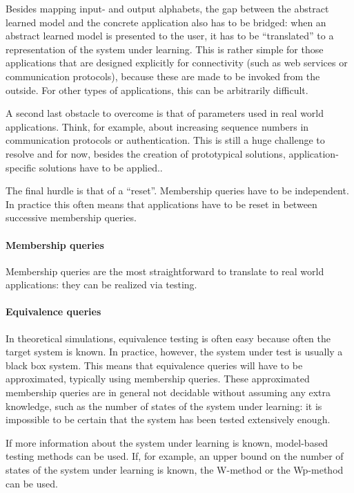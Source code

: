 \documentclass[multi,crop=false,class=article]{standalone}
\begin{document}
Besides mapping input- and output alphabets, the gap between the abstract learned model
and the concrete application also has to be bridged: when an abstract learned
model is presented to the user, it has to be ``translated'' to a representation
of the system under learning. This is rather simple for those applications that
are designed explicitly for connectivity (such as web services or communication
protocols), because these are made to be invoked from the outside. For other
types of applications, this can be arbitrarily difficult.

A second last obstacle to overcome is that of parameters used in real world
applications. Think, for example, about increasing sequence numbers in
communication protocols or authentication. This is still a huge challenge to
resolve and for now, besides the creation of prototypical solutions,
application-specific solutions have to be applied.\cite{Steffen11a}.

The final hurdle is that of a ``reset''. Membership queries have to be
independent. In practice this often means that applications have to be reset in
between successive membership queries.

\paragraph{Membership queries}
Membership queries are the most straightforward to translate to real world
applications: they can be realized via testing. %


\paragraph{Equivalence queries} In theoretical simulations, equivalence testing
is often easy because often the target system is known. In practice, however,
the system under test is usually a black box system. This means that equivalence
queries will have to be approximated, typically using membership queries. These
approximated membership queries are in general not decidable without assuming
any extra knowledge, such as the number of states of the system under
learning: it is impossible to be certain that the system has been tested
extensively\cite{Steffen11a} enough.

If more information about the system under learning is known, model-based
testing methods can be used. If, for example, an upper bound on the number of
states of the system under learning is known, the
W-method\cite{Chow78} or the
Wp-method\cite{Fujiwara91} can be used.
\end{document}
